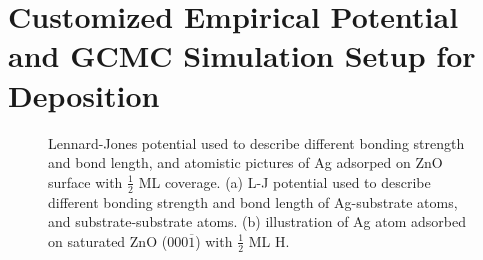\section{Customized Empirical Potential and GCMC Simulation Setup for Deposition}

\begingroup
\begin{figure}[!ht]
  \centering
  \caption[Lennard-Jones potential used to describe different bonding strength and bond length, and atomistic pictures of Ag adsorped on ZnO surface with $\frac{1}{2}$ ML coverage.]{Lennard-Jones potential used to describe different bonding strength and bond length, and atomistic pictures of Ag adsorped on ZnO surface with $\frac{1}{2}$ ML coverage. (a) \ac{L-J} potential used to describe different bonding strength and bond length of Ag-substrate atoms, and substrate-substrate atoms. (b) illustration of Ag atom adsorbed on saturated ZnO (000$\overline{1}$) with $\frac{1}{2}$ ML H.}
  \label{Chap:Ag/ZnO:fig2}
\end{figure}
\endgroup


